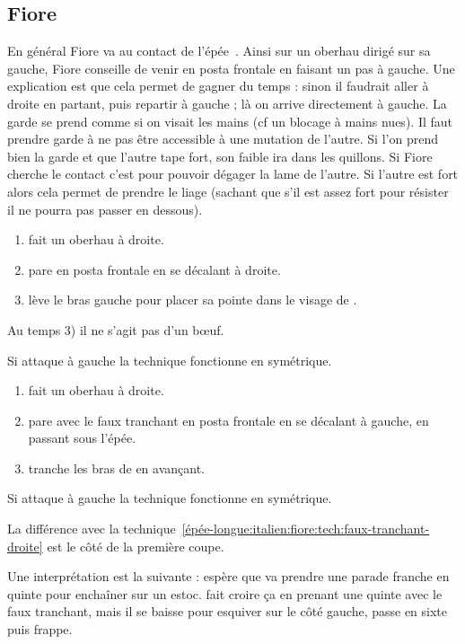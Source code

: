 \subsection{Fiore}


En général Fiore va au contact de l'épée~\cite{campo:dijon:posta_frontale:2015}.
Ainsi sur un oberhau dirigé sur sa gauche, Fiore conseille de venir en posta frontale en faisant un pas à gauche.
Une explication est que cela permet de gagner du temps : sinon il faudrait aller à droite en partant, puis repartir à gauche ; là on arrive directement à gauche.
La garde se prend comme si on visait les mains (cf un blocage à mains nues).
Il faut prendre garde à ne pas être accessible à une mutation de l'autre.
Si l'on prend bien la garde et que l'autre tape fort, son faible ira dans les quillons.
Si Fiore cherche le contact c'est pour pouvoir dégager la lame de l'autre.
Si l'autre est fort alors cela permet de prendre le liage (sachant que s'il est assez fort pour résister il ne pourra pas passer en dessous).


\begin{technique}

\begin{enumerate}
	\item \A fait un oberhau à droite.
	\item \D pare en posta frontale en se décalant à droite.
	\item \D lève le bras gauche pour placer sa pointe dans le visage de \A.
\end{enumerate}

Au temps 3) il ne s'agit pas d'un bœuf.

Si \A attaque à gauche la technique fonctionne en symétrique.

\end{technique}


\begin{technique}
\label{épée-longue:italien:fiore:tech:posta-frontale-faux-tranchant}

\begin{enumerate}
	\item \A fait un oberhau à droite.
	\item \D pare avec le faux tranchant en posta frontale en se décalant à gauche, en passant sous l'épée.
	\item \D tranche les bras de \A en avançant.
\end{enumerate}

Si \A attaque à gauche la technique fonctionne en symétrique.

La différence avec la technique~\ref{épée-longue:italien:fiore:tech:faux-tranchant-droite} est le côté de la première coupe.

Une interprétation est la suivante : \A espère que \D va prendre une parade franche en quinte pour enchaîner sur un estoc.
\D fait croire ça en prenant une quinte avec le faux tranchant, mais il se baisse pour esquiver sur le côté gauche, passe en sixte puis frappe.

\end{technique}


